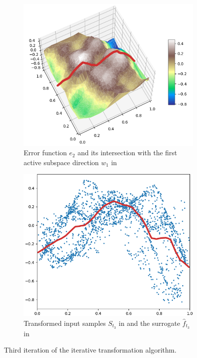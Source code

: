 \documentclass[
  a4paper,  %
  twoside,  %
  bibliography=totoc,
  headsepline,
  cleardoublepage=empty,
  parskip=half,
  draft=false
]{scrbook}
\begin{document}
\begin{mdframed}[style=style]
\begin{figure}[H]
\begin{subfigure}{.5\textwidth}
  \centering
  \includegraphics[width=.73\linewidth]{graphics/pipeline_current_3.png}
  \caption{Error function $e_2$ and its intersection with the first active subspace direction $w_1$ in \reddot}
\end{subfigure}%
\begin{subfigure}{.5\textwidth}
  \centering
  \includegraphics[width=.73\linewidth]{graphics/pipeline_local_3.png}
  \caption{Transformed input samples $S_{t_3}$ in \blue and the surrogate $\hat{f}_{t_3}$ in \reddot}
\end{subfigure}
\delimit
\caption{Third iteration of the iterative transformation algorithm.}
\label{fig:pipeline_3}
\end{figure}
\end{mdframed}
\end{document}
